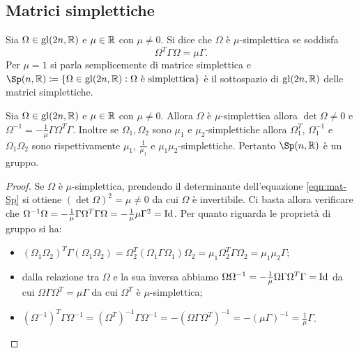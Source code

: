 \subsection{Matrici simplettiche}
\begin{definition}
    Sia $ \Omega \in \mathrm{gl}(2n, \mathbb{R}) $ e $ \mu \in \mathbb{R} $ con $ \mu \neq 0 $. Si dice che $ \Omega $ è $ \mu $-simplettica se soddisfa
    \begin{equation} \label{eqn:mat-Sp}
        \Omega^T \Gamma \Omega = \mu \Gamma.
    \end{equation}
    Per $ \mu = 1 $ si parla semplicemente di matrice simplettica e $ \Sp(n, \R) \coloneqq \{\Omega \in \gl(2n, \R) : \Omega \text{ è simplettica}\} $ è il sottospazio di $ \mathrm{gl}(2n, \mathbb{R}) $ delle matrici simplettiche.
\end{definition}

\begin{thm}
    Sia $ \Omega \in \mathrm{gl}(2n, \mathbb{R}) $ e $ \mu \in \mathbb{R} $ con $ \mu \neq 0 $. Allora $ \Omega $ è $ \mu $-simplettica allora $ \det{\Omega} \neq 0 $ e $ \Omega^{-1} = - \frac{1}{\mu} \Gamma \Omega^T \Gamma $. Inoltre se $ \Omega_1, \Omega_2 $ sono $ \mu_1 $ e $ \mu_2 $-simplettiche allora $ \Omega_1^T $, $ \Omega_1^{-1} $ e $ \Omega_1 \Omega_2 $ sono rispettivamente $ \mu_1 $, $ \frac{1}{\mu_1} $ e $ \mu_1 \mu_2 $-simplettiche. Pertanto $ \Sp(n, \R) $ è un gruppo.
\end{thm}
\begin{proof}
    Se $ \Omega $ è $ \mu $-simplettica, prendendo il determinante dell'equazione \eqref{eqn:mat-Sp} si ottiene $ (\det{\Omega})^2 = \mu \neq 0 $ da cui $ \Omega $ è invertibile. Ci basta allora verificare che $ \Omega^{-1} \Omega = -\frac{1}{\mu} \Gamma \Omega^T \Gamma \Omega = - \frac{1}{\mu} \mu \Gamma^2 = \mathrm{Id} $. Per quanto riguarda le proprietà di gruppo si ha:
    \begin{itemize}
        \item $ (\Omega_1 \Omega_2)^T \Gamma (\Omega_1 \Omega_2) = \Omega_2^T (\Omega_1 \Gamma \Omega_1) \Omega_2 = \mu_1 \Omega_2^T \Gamma \Omega_2 = \mu_1 \mu_2 \Gamma $;
        \item dalla relazione tra $ \Omega $ e la sua inversa abbiamo $ \Omega \Omega^{-1} = - \frac{1}{\mu} \Omega \Gamma \Omega^T \Gamma = \mathrm{Id} $ da cui $ \Omega \Gamma \Omega^T = \mu \Gamma $ da cui $ \Omega^T $ è $ \mu $-simplettica;
        \item $ (\Omega^{-1})^T \Gamma \Omega^{-1} = (\Omega^T)^{-1} \Gamma \Omega^{-1} = - (\Omega \Gamma \Omega^T)^{-1} = - (\mu \Gamma)^{-1} = \frac{1}{\mu} \Gamma $. \qedhere
    \end{itemize}
\end{proof}

